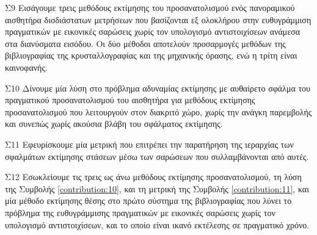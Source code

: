 \begin{bw_box}
\begin{customcontribution}{Σ9}
  \label{contribution:09}
  Εισάγουμε τρεις μεθόδους εκτίμησης του προσανατολισμού ενός πανοραμικού
  αισθητήρα δισδιάστατων μετρήσεων που βασίζονται εξ ολοκλήρου στην
  ευθυγράμμιση πραγματικών με εικονικές σαρώσεις χωρίς τον υπολογισμό
  αντιστοιχίσεων ανάμεσα στα διανύσματα εισόδου. Οι δύο μέθοδοι αποτελούν
  προσαρμογές μεθόδων της βιβλιογραφίας της κρυσταλλογραφίας και της
  μηχανικής όρασης, ενώ η τρίτη είναι καινοφανής.
\end{customcontribution}
\end{bw_box}

\begin{bw_box}
\begin{customcontribution}{Σ10}
  \label{contribution:10}
  Δίνουμε μία λύση στο πρόβλημα αδυναμίας εκτίμησης με αυθαίρετο σφάλμα του
  πραγματικού προσανατολισμού του αισθητήρα για μεθόδους εκτίμησης
  προσανατολισμού που λειτουργούν στον διακριτό χώρο, χωρίς την ανάγκη
  παρεμβολής και συνεπώς χωρίς ακούσια βλάβη του σφάλματος εκτίμησης.
\end{customcontribution}
\end{bw_box}

\begin{bw_box}
\begin{customcontribution}{Σ11}
  \label{contribution:11}
  Εφευρίσκουμε μία μετρική που επιτρέπει την παρατήρηση της ιεραρχίας των
  σφαλμάτων εκτίμησης στάσεων μέσω των σαρώσεων που συλλαμβάνονται από αυτές.
\end{customcontribution}
\end{bw_box}

\begin{bw_box}
\begin{customcontribution}{Σ12}
  \label{contribution:12}
  Εσωκλείουμε τις τρεις ως άνω μεθόδους εκτίμησης προσανατολισμού, τη λύση της
  Συμβολής \ref{contribution:10}, και τη μετρική της Συμβολής
  \ref{contribution:11}, και μία μέθοδο εκτίμησης θέσης στο πρώτο σύστημα της
  βιβλιογραφίας που λύνει το πρόβλημα της ευθυγράμμισης πραγματικών με
  εικονικές σαρώσεις χωρίς τον υπολογισμό αντιστοιχίσεων, και το οποίο είναι
  ικανό εκτέλεσης σε πραγματικό χρόνο.
\end{customcontribution}
\end{bw_box}

